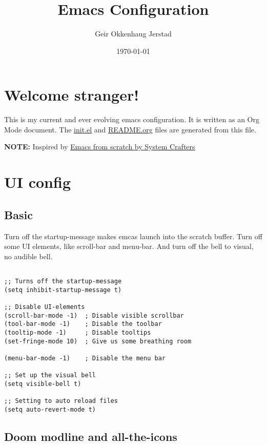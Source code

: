 \documentclass[11pt]{article}
\author{Geir Okkenhaug Jerstad}
\date{\today}
\title{Emacs Configuration}
\begin{document}
\maketitle
\tableofcontents


\section{Welcome stranger!}
\label{sec:orgac81020}

This is my current and ever evolving emacs configuration. It is written as an Org Mode document. The \href{init.el}{init.el} and \href{}{README.org} files are generated from this file.

\textbf{NOTE:} Inspired by \href{https://github.com/daviwil/emacs-from-scratch/}{Emacs from scratch by System Crafters}

\section{UI config}
\label{sec:orgea8b2e0}

\subsection{Basic}
\label{sec:org6bbe542}

Turn off the startup-message makes emcas launch into the scratch buffer.
Turn off some UI elements, like scroll-bar and menu-bar.
And turn off the bell to visual, no audible bell.

\begin{verbatim}

;; Turns off the startup-message
(setq inhibit-startup-message t)

;; Disable UI-elements
(scroll-bar-mode -1)  ; Disable visible scrollbar
(tool-bar-mode -1)    ; Disable the toolbar
(tooltip-mode -1)     ; Disable tooltips
(set-fringe-mode 10)  ; Give us some breathing room

(menu-bar-mode -1)    ; Disable the menu bar

;; Set up the visual bell
(setq visible-bell t)

;; Setting to auto reload files
(setq auto-revert-mode t)

\end{verbatim}

\subsection{Doom modline and all-the-icons}
\label{sec:org8597fd5}
\end{document}
